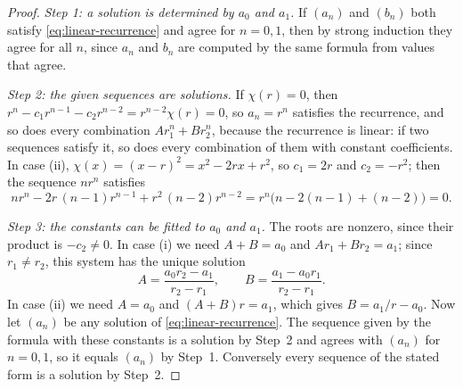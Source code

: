 \begin{proof}
\emph{Step 1: a solution is determined by $a_0$ and $a_1$.} If $(a_n)$ and $(b_n)$ both satisfy \eqref{eq:linear-recurrence} and agree for $n=0,1$, then by strong induction they agree for all $n$, since $a_n$ and $b_n$ are computed by the same formula from values that agree.

\emph{Step 2: the given sequences are solutions.} If $\chi(r)=0$, then $r^n-c_1r^{n-1}-c_2r^{n-2}=r^{n-2}\chi(r)=0$, so $a_n=r^n$ satisfies the recurrence, and so does every combination $Ar_1^n+Br_2^n$, because the recurrence is linear: if two sequences satisfy it, so does every combination of them with constant coefficients. In case (ii), $\chi(x)=(x-r)^2=x^2-2rx+r^2$, so $c_1=2r$ and $c_2=-r^2$; then the sequence $nr^n$ satisfies
\[
nr^n-2r\,(n-1)r^{n-1}+r^2\,(n-2)r^{n-2}=r^n\bigl(n-2(n-1)+(n-2)\bigr)=0 .
\]

\emph{Step 3: the constants can be fitted to $a_0$ and $a_1$.} The roots are nonzero, since their product is $-c_2\ne0$. In case (i) we need $A+B=a_0$ and $Ar_1+Br_2=a_1$; since $r_1\ne r_2$, this system has the unique solution
\[
A=\frac{a_0r_2-a_1}{r_2-r_1},\qquad B=\frac{a_1-a_0r_1}{r_2-r_1}.
\]
In case (ii) we need $A=a_0$ and $(A+B)r=a_1$, which gives $B=a_1/r-a_0$. Now let $(a_n)$ be any solution of \eqref{eq:linear-recurrence}. The sequence given by the formula with these constants is a solution by Step~2 and agrees with $(a_n)$ for $n=0,1$, so it equals $(a_n)$ by Step~1. Conversely every sequence of the stated form is a solution by Step~2.
\end{proof}

